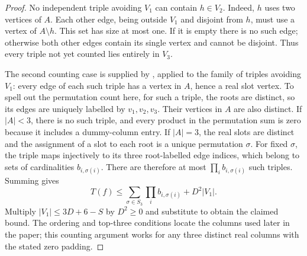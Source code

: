 \begin{proof}
No independent triple avoiding $V_1$ can contain $h\in V_2$. Indeed,
$h$ uses two vertices of $A$. Each other edge, being outside $V_1$ and
disjoint from $h$, must use a vertex of $A\setminus h$. This set has
size at most one. If it is empty there is no such edge; otherwise both
other edges contain its single vertex and cannot be disjoint. Thus
every triple not yet counted lies entirely in $V_3$.

The second counting case is supplied by
, applied to the
family of triples avoiding $V_1$: every edge of each such triple has
a vertex in $A$, hence a real slot vertex. To spell out the permutation
count here, for such a triple, the roots are distinct, so its edges are uniquely
labelled by $v_1,v_2,v_3$. Their vertices in $A$ are also distinct.
If $|A|<3$, there is no such triple, and every product in the
permutation sum is zero because it includes a dummy-column entry.
If $|A|=3$, the real slots are distinct and the assignment of a slot
to each root is a unique permutation $\sigma$. For fixed $\sigma$,
the triple maps injectively to its three root-labelled edge indices,
which belong to sets of cardinalities $b_{i,\sigma(i)}$. There are
therefore at most $\prod_i b_{i,\sigma(i)}$ such triples. Summing gives
\[
T(f)\le\sum_{\sigma\in S_3}\prod_i b_{i,\sigma(i)}+D^2|V_1|.
\]
Multiply $|V_1|\le3D+6-S$ by $D^2\ge0$ and substitute to obtain the
claimed bound. The ordering and top-three conditions locate the
columns used later in the paper; this counting argument works for any
three distinct real columns with the stated zero padding.
\end{proof}
